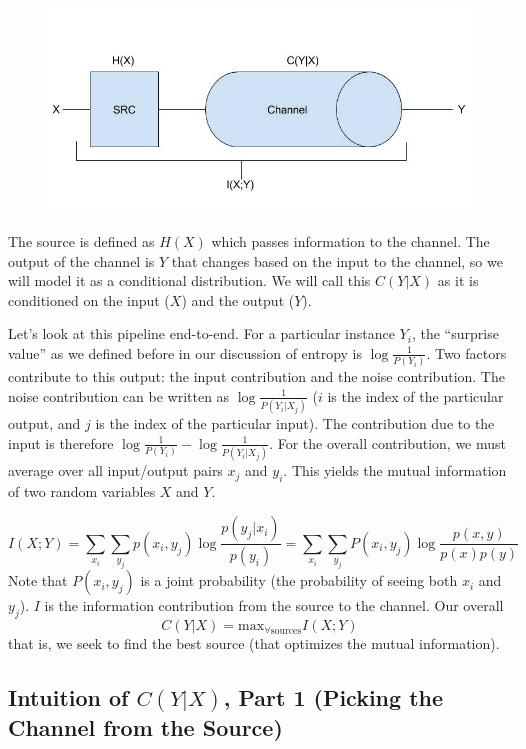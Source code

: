 \documentclass[11pt]{article}
\theoremstyle{definition}
\begin{document}
\begin{figure}[h]
\centering
\includegraphics[scale=0.35]{sourcechannel}
\end{figure}

The source is defined as $H(X)$ which passes information to the channel. The output of the channel is $Y$ that changes based on the input to the channel, so we will model it as a conditional distribution. We will call this $C(Y | X)$ as it is conditioned on the input ($X$) and the output ($Y$). 

Let's look at this pipeline end-to-end. For a particular instance $Y_i$, the ``surprise value'' as we defined before in our discussion of entropy is $\log \frac{1}{P(Y_i)}$. Two factors contribute to this output: the input contribution and the noise contribution. The noise contribution can be written as $\log \frac{1}{P(Y_i | X_j)}$ ($i$ is the index of the particular output, and $j$ is the index of the particular input). The contribution due to the input is therefore $\log \frac{1}{P(Y_i)} - \log \frac{1}{P(Y_i | X_j)}$. For the overall contribution, we must average over all input/output pairs $x_j$ and $y_i$. This yields the mutual information of two random variables $X$ and $Y$. 

 $$I(X ; Y) = \sum_{x_i} \sum_{y_j} p(x_i, y_j) \log \frac{p(y_j | x_i)}{p(y_i)} = \sum_{x_i} \sum_{y_j} P(x_i, y_j) \log \frac{p(x,y)}{p(x)p(y)}$$
Note that $P(x_i, y_j)$ is a joint probability (the probability of seeing both $x_i$ and $y_j$). $I$ is the information contribution from the source to the channel. Our overall $$C(Y | X) = \text{max}_{\forall \text{sources}} I(X ; Y)$$that is, we seek to find the best source (that optimizes the mutual information). 

\subsection{Intuition of $C(Y | X)$, Part 1 (Picking the Channel from the Source)}
\end{document}
